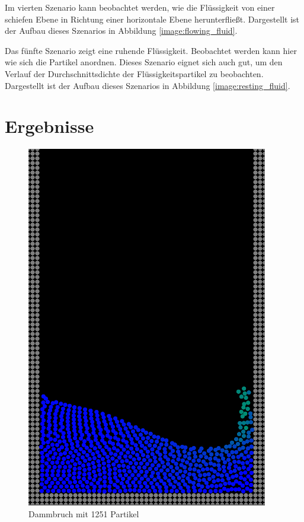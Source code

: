 \documentclass[11pt,
a4paper,
parskip=half, %
BCOR=10mm, %
english,
ngerman]{scrreprt}
\begin{document}
Im vierten Szenario kann beobachtet werden, wie die Flüssigkeit von einer schiefen Ebene in Richtung einer horizontale Ebene herunterfließt.
Dargestellt ist der Aufbau dieses Szenarios in Abbildung \ref{image:flowing_fluid}.

Das fünfte Szenario zeigt eine ruhende Flüssigkeit.
Beobachtet werden kann hier wie sich die Partikel anordnen.
Dieses Szenario eignet sich auch gut, um den Verlauf der Durchschnittsdichte der Flüssigkeitspartikel zu beobachten.
Dargestellt ist der Aufbau dieses Szenarios in Abbildung \ref{image:resting_fluid}.


\section{Ergebnisse}
\begin{figure}[htb]
    \begin{minipage}[t]{0.45\linewidth}
        \centering
        \includegraphics[width=0.7\linewidth]{Dammbruch_Experiment1.png}
        \caption{Dammbruch mit 1251 Partikel}
        \label{image:breaking_dam_experiment1}
    \end{minipage}
    \hfill
    \begin{minipage}[t]{0.45\linewidth}
        \centering

\end{minipage}
\end{figure}
\end{document}
